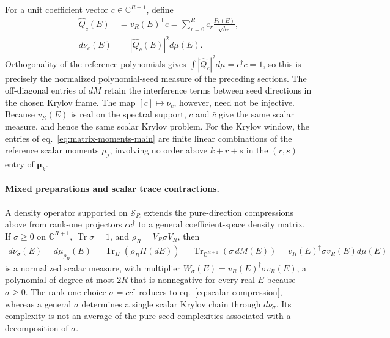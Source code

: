 \documentclass[a4paper,11pt]{article}
\def\dd{d}%
\def\cH{H}%
\theoremstyle{definition}
\theoremstyle{remark}
\newcommand{\dd}{\mathrm d}
\newcommand{\CC}{\mathbb C}
\newcommand{\cH}{\mathcal H}
\newcommand{\Qhat}{\widehat Q}
\begin{document}
For a unit coefficient vector $c\in\CC^{R+1}$, define 
\begin{equation}
\begin{aligned}
   \Qhat_c(E)
   &=v_R(E)^{\mathsf T}c
   =\sum_{r=0}^{R}c_r\frac{P_r(E)}{\sqrt{h_r}},\\
   \dd\nu_c(E)
   &=|\Qhat_c(E)|^2\dd\mu(E).
\end{aligned}
   \label{eq:krylov-block-compression}
\end{equation}
Orthogonality of the reference polynomials gives
$\int|\Qhat_c|^2\dd\mu=c^\dagger c=1$, so this is precisely the
normalized polynomial-seed measure of the preceding sections.  The
off-diagonal entries of $\dd M$ retain the interference terms between
seed directions in the chosen Krylov frame.    The map $[c]\mapsto\nu_c$,
however, need not be injective.  Because $v_R(E)$ is real on the spectral support,
$c$ and $\bar c$ give the same scalar measure, and hence the same scalar
Krylov problem.  For the Krylov window, the entries of
eq.~\eqref{eq:matrix-moments-main} are finite linear combinations of the
reference scalar moments $\mu_j$, involving no order above $k+r+s$ in
the $(r,s)$ entry of $\boldsymbol{\mu}_k$.

\paragraph{Mixed preparations and scalar trace contractions.}
A density operator supported on $\mathcal S_R$ extends the pure-direction compressions above
from rank-one projectors $cc^\dagger$ to a general coefficient-space density matrix. If
$\sigma\ge0$ on $\CC^{R+1}$, $\operatorname{Tr}\sigma=1$, and
$\rho_R=V_R\sigma V_R^\dagger$, then 
\begin{equation}
\begin{aligned}
   \dd\nu_\sigma(E)
   =\dd\mu_{\rho_R}(E)
   =\operatorname{Tr}_{\cH}\!\left(\rho_R\Pi(\dd E)\right)
   =\operatorname{Tr}_{\CC^{R+1}}\!\left(\sigma\,\dd M(E)\right)
   =v_R(E)^\dagger\sigma v_R(E)\dd\mu(E)
\end{aligned}
   \label{eq:matrix-trace-compression-main}
\end{equation}
is a normalized scalar measure, with multiplier $W_\sigma(E)=v_R(E)^\dagger\sigma v_R(E)$, a polynomial of degree at most $2R$ that is nonnegative for every real $E$ because $\sigma\ge0$.  The rank-one choice
$\sigma=cc^\dagger$ reduces to eq.~\eqref{eq:scalar-compression}, whereas
a general $\sigma$ determines a single scalar Krylov chain through
$\dd\nu_\sigma$.  Its complexity is not an average of the pure-seed
complexities associated with a decomposition of $\sigma$. 
\end{document}
